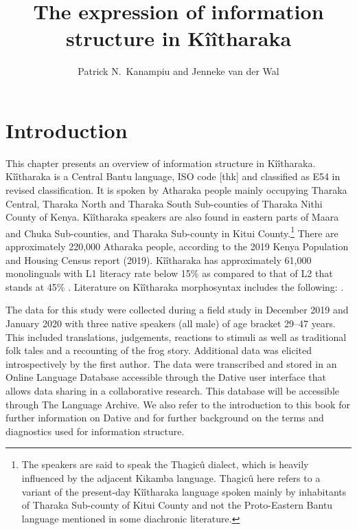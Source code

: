\documentclass[output=paper]{langscibook}
\author{Patrick N.\ Kanampiu\orcid{}\affiliation{Tharaka University College} and Jenneke van der Wal\orcid{}\affiliation{Leiden University}}
\title{The expression of information structure in Kîîtharaka}
\begin{document}
\maketitle
\label{ch:4}


\section{Introduction}

This chapter presents an overview of information structure in Kîîtharaka. Kîîtharaka is a Central Bantu language, ISO code [thk] and classified as E54 in  revised \citet{Guthrie1948} classification. It is spoken by Atharaka people mainly occupying Tharaka Central, Tharaka North and Tharaka South Sub-counties of Tharaka Nithi County of Kenya. Kîîtharaka speakers are also found in eastern parts of Maara and Chuka Sub-counties, and Tharaka Sub-county in Kitui County.\footnote{The speakers are said to speak the Thagicû dialect, which is heavily influenced by the adjacent Kikamba language. Thagicû here refers to a variant of the present-day Kîîtharaka language spoken mainly by inhabitants of Tharaka Sub-county of Kitui County and not the Proto-Eastern Bantu language mentioned in some diachronic literature.} There are approximately 220,000 Atharaka people, according to the 2019 Kenya Population and Housing Census report (2019). Kîîtharaka has approximately 61,000 monolinguals with L1 literacy rate below 15\% as compared to that of L2 that stands at 45\% \citep{EberhardEtAl2022}. Literature on Kîîtharaka morphosyntax includes the following: \citet{Lindblom1914,Harford1991,Harford1997,waMberia1993,Muriungi2005,Muriungi2008,Muriungi2014,AbelsMuriungi2008,Kanampiu2017,KanampiuMuriungi2019}.

The data for this study were collected during a field study in December 2019 and January 2020 with three native speakers (all male) of age bracket 29--47 years. This included translations, judgements, reactions to stimuli as well as traditional folk tales and a recounting of the frog story. Additional data was elicited introspectively by the first author. The data were transcribed and stored in an Online Language Database accessible through the Dative user interface that allows data sharing in a collaborative research. This database will be accessible through The Language Archive. We also refer to the introduction to this book for further information on Dative and for further background on the terms and diagnostics used for information structure.
\end{document}
